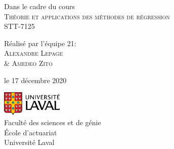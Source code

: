 \documentclass{article}
\begin{document}
\begin{titlepage}
		Dans le cadre du cours\\
		{\scshape\Large Théorie et applications des méthodes de régression \\ STT-7125}
		
		
		\vspace*{4\baselineskip} %
		
		
		Réalisé par l'équipe 21:\\
		{\scshape\Large Alexandre Lepage\\
		\& Amedeo Zito} %
		
		\vspace*{5\baselineskip}
		
		le 17 décembre 2020
		
		\vspace{0.4\baselineskip} %
		
		\vfill %
		
		
		\includegraphics[height=1.2cm]{UL_P.pdf}\\
		
		Faculté des sciences et de génie\\
		École d'actuariat\\
		Université Laval
		
		\vspace*{3\baselineskip}
		
	\end{titlepage}
	
	\setcounter{page}{0} 
	
	\newpage
	\strut %
	\newpage
	
	\tableofcontents
	\renewcommand{\listfigurename}{Liste des illustrations}
	
	\listoffigures
	\newpage
	
	\setcounter{page}{1}
\end{document}
